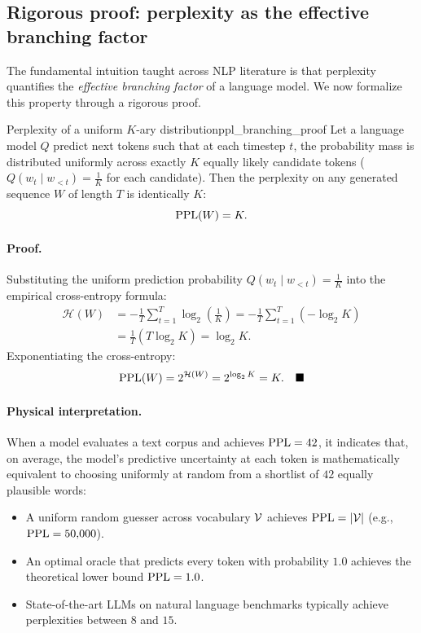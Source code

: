 \documentclass[../../main.tex]{subfiles}
\begin{document}
\subsection{Rigorous proof: perplexity as the effective branching factor}
The fundamental intuition taught across NLP literature is that perplexity quantifies the \emph{effective branching factor} of a language model. We now formalize this property through a rigorous proof.

\begin{theorem}{Perplexity of a uniform $K$-ary distribution}{ppl_branching_proof}
Let a language model $Q$ predict next tokens such that at each timestep $t$, the probability mass is distributed uniformly across exactly $K$ equally likely candidate tokens ($Q(w_t \mid w_{<t}) = \frac{1}{K}$ for each candidate). Then the perplexity on any generated sequence $W$ of length $T$ is identically $K$:
\begin{equation}
\label{eq:ppl_equals_k}
\mathrm{PPL}(W) = K.
\end{equation}
\end{theorem}

\paragraph{Proof.}
Substituting the uniform prediction probability $Q(w_t \mid w_{<t}) = \frac{1}{K}$ into the empirical cross-entropy formula:
\begin{align*}
\mathcal{H}(W) &= - \frac{1}{T} \sum_{t=1}^T \log_2 \left( \frac{1}{K} \right) = - \frac{1}{T} \sum_{t=1}^T \left( - \log_2 K \right) \\
&= \frac{1}{T} \left( T \log_2 K \right) = \log_2 K.
\end{align*}
Exponentiating the cross-entropy:
\[
\mathrm{PPL}(W) = 2^{\mathcal{H}(W)} = 2^{\log_2 K} = K. \quad \blacksquare
\]

\paragraph{Physical interpretation.}
When a model evaluates a text corpus and achieves $\mathrm{PPL} = 42$, it indicates that, on average, the model's predictive uncertainty at each token is mathematically equivalent to choosing uniformly at random from a shortlist of $42$ equally plausible words:
\begin{itemize}
    \item A uniform random guesser across vocabulary $\mathcal{V}$ achieves $\mathrm{PPL} = |\mathcal{V}|$ (e.g., $\mathrm{PPL} = 50{,}000$).
    \item An optimal oracle that predicts every token with probability $1.0$ achieves the theoretical lower bound $\mathrm{PPL} = 1.0$.
    \item State-of-the-art LLMs on natural language benchmarks typically achieve perplexities between $8$ and $15$.
\end{itemize}
\end{document}
